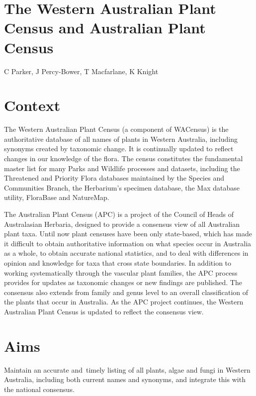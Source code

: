 \documentclass[version=last,
    paper=a4, %
    10pt, %
    usenames,
    dvipsnames,
    oneside, %
    headings=openany, %
    DIV=15 %
]{scrbook}
\begin{document}
\section*{The Western Australian Plant Census and Australian Plant Census
}

C Parker, J Percy-Bower, T Macfarlane, K Knight



\section*{Context}

The Western Australian Plant Census (a component of WACensus) is the
authoritative database of all names of plants in Western Australia,
including synonyms created by taxonomic change. It is continually
updated to reflect changes in our knowledge of the flora. The census
constitutes the fundamental master list for many Parks and Wildlife
processes and datasets, including the Threatened and Priority Flora
databases maintained by the Species and Communities Branch, the
Herbarium's specimen database, the Max database utility, FloraBase and
NatureMap.

The Australian Plant Census (APC) is a project of the Council of Heads
of Australasian Herbaria, designed to provide a consensus view of all
Australian plant taxa. Until now plant censuses have been only
state-based, which has made it difficult to obtain authoritative
information on what species occur in Australia as a whole, to obtain
accurate national statistics, and to deal with differences in opinion
and knowledge for taxa that cross state boundaries. In addition to
working systematically through the vascular plant families, the APC
process provides for updates as taxonomic changes or new findings are
published. The consensus also extends from family and genus level to an
overall classification of the plants that occur in Australia. As the APC
project continues, the Western Australian Plant Census is updated to
reflect the consensus view.




\section*{Aims}

Maintain an accurate and~timely listing of all plants, algae and fungi
in Western Australia, including both current names and synonyms, and
integrate this with the national consensus.
\end{document}
